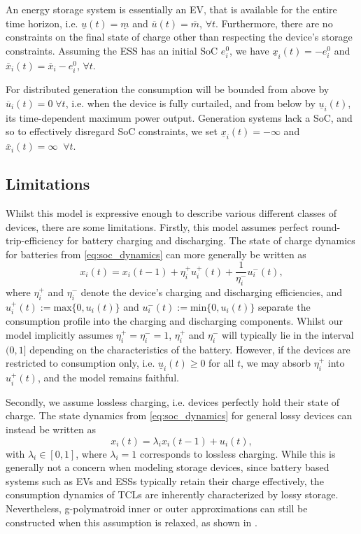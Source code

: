 An energy storage system is essentially an EV, that is available for the entire time horizon, i.e. $\underline{u}(t) = \underline{m}$ and  $\overline{u}(t) = \overline{m}$, $\forall t$. Furthermore, there are no constraints on the final state of charge other than respecting the device's storage constraints. Assuming the ESS has an initial SoC $e^0_{i}$, we have $\underline{x}_i(t) = -e^0_{i}$ and $\overline{x}_i(t) = \overline{x}_i - e^0_{i}$, $\forall t$.

For distributed generation the consumption will be bounded from above by $\overline{u}_i(t) = 0 \; \forall t$, i.e. when the device is fully curtailed, and from below by $\underline{u}_i(t)$, its time-dependent maximum power output. Generation systems lack a SoC, and so to effectively disregard SoC constraints, we set  $\underline{x}_i(t) = -\infty$ and $\overline{x}_i(t) = \infty \;\; \forall t$. 


\subsection{Limitations}
Whilst this model is expressive enough to describe  various different classes of devices, there are some limitations. Firstly, this model assumes perfect round-trip-efficiency for battery charging and discharging. The state of charge dynamics for batteries from \eqref{eq:soc_dynamics} can more generally be written as
\begin{equation*}
    x_i(t) =  x_i(t-1) + \eta_i^+ u_i^+(t) + \frac{1}{\eta_i^-} u_i^-(t), 
\end{equation*}
where $\eta_i^+$ and $\eta_i^-$ denote the device's charging and discharging efficiencies, and $ u_i^+(t) := \textrm{max}\{0, u_i(t)\}$ and $u_i^-(t) := \textrm{min}\{0, u_i(t)\}$ separate the consumption profile into the charging and discharging components. Whilst our model implicitly assumes $\eta_i^+ = \eta_i^- = 1$, $\eta_i^+$ and $\eta_i^-$ will typically lie in the interval $(0, 1]$ depending on the characteristics of the battery. However, if the devices are restricted to consumption only, i.e. $\underline{u}_i(t) \geq 0$ for all $t$, we may absorb $\eta_i^+$ into $u_i^+(t)$,  and the model remains faithful.


Secondly, we assume lossless charging, i.e. devices perfectly hold their state of charge. The state dynamics from \eqref{eq:soc_dynamics} for general lossy devices can instead be written as 
\begin{equation}
    x_i(t) = \lambda_i x_i(t-1) + u_i(t), 
\end{equation}
with $\lambda_i \in [0,1]$, where $\lambda_i = 1$ corresponds to lossless charging. While this is generally not a concern when modeling storage devices, since battery based systems such as EVs and ESSs typically retain their charge effectively, the consumption dynamics of TCLs are inherently characterized by lossy storage. Nevertheless, g-polymatroid inner or outer approximations can still be constructed when this assumption is relaxed, as shown in \cite{Mukhi2025AggregatePolymatroids}.

